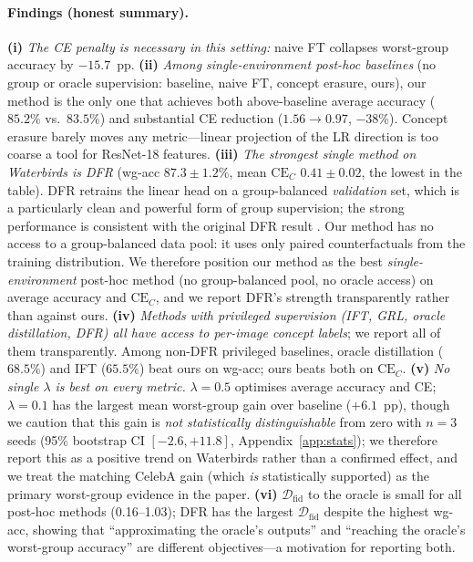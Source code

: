 \documentclass{article}
\newcommand{\CE}{\mathrm{CE}}
\newcommand{\Dfid}{\mathcal{D}_{\mathrm{fid}}}
\begin{document}
\paragraph{Findings (honest summary).}
\textbf{(i)} \emph{The CE penalty is necessary in this setting:} naive FT
collapses worst-group accuracy by $-15.7$~pp.
\textbf{(ii)} \emph{Among single-environment post-hoc baselines} (no group or
oracle supervision: baseline, naive FT, concept erasure, ours), our method is
the only one that achieves both above-baseline average accuracy ($85.2\%$ vs.\
$83.5\%$) and substantial CE reduction ($1.56\!\to\!0.97$, $-38\%$).  Concept
erasure barely moves any metric---linear projection of the LR direction is too
coarse a tool for ResNet-18 features.
\textbf{(iii)} \emph{The strongest single method on Waterbirds is DFR}
(wg-acc $87.3 \pm 1.2\%$, mean $\CE_C$ $0.41 \pm 0.02$, the lowest in the
table).  DFR retrains the linear head on a group-balanced \emph{validation}
set, which is a particularly clean and powerful form of group supervision;
the strong performance is consistent with the original DFR result
\cite{kirichenko2023last}.  Our method has no access to a group-balanced
data pool: it uses only paired counterfactuals from the training
distribution.  We therefore position our method as the best
\emph{single-environment} post-hoc method (no group-balanced pool, no oracle
access) on average accuracy and $\CE_C$, and we report DFR's strength
transparently rather than against ours.
\textbf{(iv)} \emph{Methods with privileged supervision (IFT, GRL, oracle
distillation, DFR) all have access to per-image concept labels}; we report
all of them transparently.  Among non-DFR privileged baselines, oracle
distillation ($68.5\%$) and IFT ($65.5\%$) beat ours on wg-acc; ours beats
both on $\CE_C$.
\textbf{(v)} \emph{No single $\lambda$ is best on every metric.}  $\lambda{=}0.5$
optimises average accuracy and CE; $\lambda{=}0.1$ has the largest mean
worst-group gain over baseline ($+6.1$~pp), though we caution that this gain
is \emph{not statistically distinguishable} from zero with $n{=}3$ seeds (95\%
bootstrap CI $[-2.6, +11.8]$, Appendix~\ref{app:stats}); we therefore report
this as a positive trend on Waterbirds rather than a confirmed effect, and we
treat the matching CelebA gain (which \emph{is} statistically supported) as
the primary worst-group evidence in the paper.
\textbf{(vi)} $\Dfid$ to the oracle is small for all post-hoc methods
(0.16--1.03); DFR has the largest $\Dfid$ despite the highest wg-acc, showing
that ``approximating the oracle's outputs'' and ``reaching the oracle's
worst-group accuracy'' are different objectives---a motivation for reporting
both.
\end{document}
